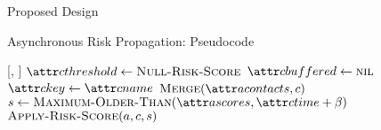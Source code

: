 \documentclass[11pt]{beamer}
\begin{document}
\begin{section}{Proposed Design}
\begin{frame}{Asynchronous Risk Propagation: Pseudocode}
\begin{function}{\nHandleContact}[\vActor, \vContact]
    \pause
    \State $\aContactThreshold \assign \cNullRiskScore$
    \pause
    \State $\aContactBuffered \assign \nil$
    \pause
    \State $\aContactKey \assign \aContactName$
    \pause
    \State $\cMerge[\aActorContacts, \vContact]$
    \pause
    \State $\vScore \assign \cMaximumOlderThan[\aActorScores, \aContactTime + \pTimeBuffer]$
    \pause
    \State $\cApplyRiskScore[\vActor, \vContact, \vScore]$
  \EndIf
\end{function}
\end{frame}

\end{section}
\end{document}

